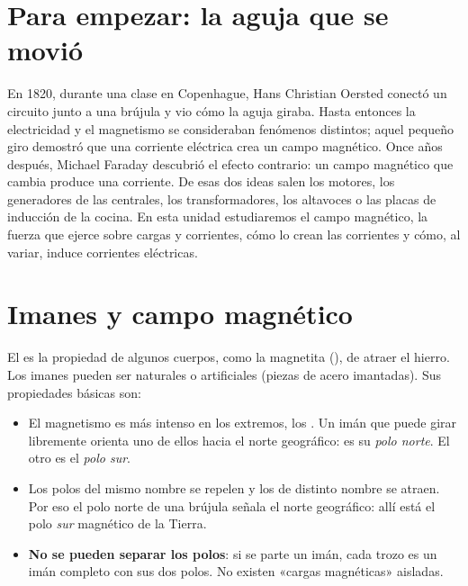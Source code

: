 
\section*{Para empezar: la aguja que se movió}

En 1820, durante una clase en Copenhague, Hans Christian Oersted conectó un circuito junto a una brújula y vio cómo la aguja
giraba. Hasta entonces la electricidad y el magnetismo se consideraban fenómenos distintos; aquel pequeño giro demostró que
una corriente eléctrica crea un campo magnético. Once años después, Michael Faraday descubrió el efecto contrario: un campo
magnético que cambia produce una corriente. De esas dos ideas salen los motores, los generadores de las centrales, los
transformadores, los altavoces o las placas de inducción de la cocina. En esta unidad estudiaremos el campo magnético, la
fuerza que ejerce sobre cargas y corrientes, cómo lo crean las corrientes y cómo, al variar, induce corrientes eléctricas.

\section{Imanes y campo magnético}\label{sec:mag-imanes}

El  es la propiedad de algunos cuerpos, como la magnetita (), de atraer el hierro. Los imanes
pueden ser naturales o artificiales (piezas de acero imantadas). Sus propiedades básicas son:
\begin{itemize}
    \item El magnetismo es más intenso en los extremos, los . Un imán que puede girar libremente orienta uno de
    ellos hacia el norte geográfico: es su \emph{polo norte}. El otro es el \emph{polo sur}.
    \item Los polos del mismo nombre se repelen y los de distinto nombre se atraen. Por eso el polo norte de una brújula
    señala el norte geográfico: allí está el polo \emph{sur} magnético de la Tierra.
    \item \textbf{No se pueden separar los polos}: si se parte un imán, cada trozo es un imán completo con sus dos polos. No
    existen «cargas magnéticas» aisladas.
\end{itemize}

